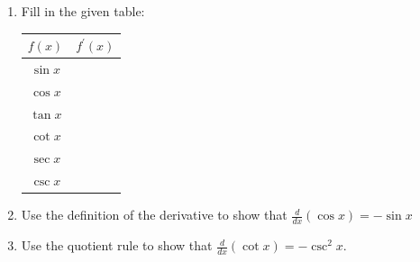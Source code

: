 \documentclass[12pt]{article}
\newif\ifans
\begin{document}
\begin{enumerate}

\item Fill in the given table:

\begin{center}
\begin{tabular}{c|c}
$f(x)$ & $f^{\prime}(x)$\\
\hline
$\sin{x}$ &  \\
\hline
$\cos{x}$ & \\
\hline
$\tan{x}$ & \\
\hline
$\cot{x}$ & \\
\hline
$\sec{x}$ & \\
\hline
$\csc{x}$ & 
\end{tabular}
\end{center}

\ifans{\fbox{
\begin{tabular}{c|c}
$f(x)$ & $f^{\prime}(x)$\\
\hline
$\sin{x}$ & $\cos{x}$  \\
\hline
$\cos{x}$ & $-\sin{x}$ \\
\hline
$\tan{x}$ & $\sec^2{x}$\\
\hline
$\cot{x}$ & $-\csc^2{x}$\\
\hline
$\sec{x}$ & $\sec{x}\tan{x}$\\
\hline
$\csc{x}$ & $-\csc{x}\cot{x}$ 
\end{tabular}
}} \fi

\newpage

\item Use the definition of the derivative to show that $\frac{d}{dx}(\cos{x})=-\sin{x}$

\ifans{\fbox{\parbox{0.5\linewidth}{
\begin{align*}
\frac{d}{dx}(\cos{x})&=\lim_{h \rightarrow 0}{\frac{\cos{(x+h)}-\cos{x}}{h}}\\
&=\lim_{h \rightarrow 0}{\frac{\cos{x}\cos{h}-\sin{x}\sin{h}-\cos{x}}{h}}\\
&=\lim_{h \rightarrow 0}{\left(\frac{\cos{x}\cos{h}-\cos{x}}{h}-\frac{\sin{x}\sin{h}}{h}\right)}\\
&=\lim_{h \rightarrow 0}{\left(\cos{x}\frac{\cos{h}-1}{h}-\sin{x}\frac{\sin{h}}{h}\right)}\\
&=(\cos{x})(0)-(\sin{x})(1)\\
&=-\sin{x}
\end{align*}
}}} \fi
\item Use the quotient rule to show that $\frac{d}{dx}(\cot{x})=-\csc^2{x}$.


\end{enumerate}
\end{document}
